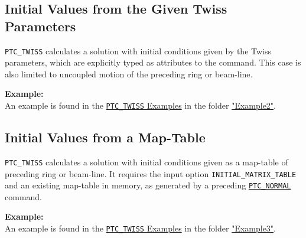 \subsection{Initial Values from the Given Twiss Parameters}
\label{subsec:from-twiss-command}

\texttt{PTC\_TWISS} calculates a solution with initial conditions
given by the Twiss parameters, which are explicitly typed as attributes
to the command. 
This case is also limited to uncoupled motion of the preceding ring or
beam-line.  



\textbf{Example:} \\
An example is found in the
\href{http://madx.web.cern.ch/madx/madX/examples/ptc_twiss/}
{\texttt{PTC\_TWISS} Examples} 
in the folder
\href{http://madx.web.cern.ch/madx/madX/examples/ptc_twiss/Example2}
{"Example2"}.  


\subsection{Initial Values from a Map-Table}
\label{subsec:from-map-table}

\texttt{PTC\_TWISS} calculates a solution with initial conditions given
as a map-table of preceding ring or beam-line. It requires the input
option \texttt{INITIAL\_MATRIX\_TABLE} and an existing map-table
in memory, as generated by a preceding
\hyperref[sec:ptc-normal]{\texttt{PTC\_NORMAL}} command.  


\textbf{Example:} \\
An example is found in the
\href{http://madx.web.cern.ch/madx/madX/examples/ptc_twiss/}
{\texttt{PTC\_TWISS} Examples} in the folder
\href{http://madx.web.cern.ch/madx/madX/examples/ptc_twiss/Example3}
{"Example3"}. 


